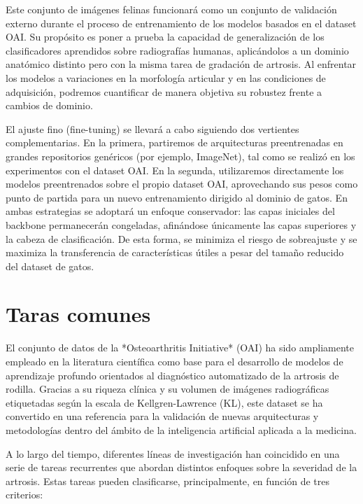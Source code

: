 \documentclass[11pt,spanish,listoffigures,listoftables]{tfgetsinf}
\begin{document}
Este conjunto de imágenes felinas funcionará como un conjunto de validación externo durante el proceso de entrenamiento de 
los modelos basados en el dataset OAI. Su propósito es poner a prueba la capacidad de generalización de los clasificadores 
aprendidos sobre radiografías humanas, aplicándolos a un dominio anatómico distinto pero con la misma tarea de gradación 
de artrosis. Al enfrentar los modelos a variaciones en la morfología articular y en las condiciones de adquisición, 
podremos cuantificar de manera objetiva su robustez frente a cambios de dominio.

El ajuste fino (fine-tuning) se llevará a cabo siguiendo dos vertientes complementarias. En la primera, partiremos de 
arquitecturas preentrenadas en grandes repositorios genéricos (por ejemplo, ImageNet), tal como se realizó en los
experimentos con el dataset OAI. En la segunda, utilizaremos directamente los modelos preentrenados sobre el propio 
dataset OAI, aprovechando sus pesos como punto de partida para un nuevo entrenamiento dirigido al dominio de gatos. 
En ambas estrategias se adoptará un enfoque conservador: las capas iniciales del backbone permanecerán congeladas, 
afinándose únicamente las capas superiores y la cabeza de clasificación. De esta forma, se minimiza el riesgo de 
sobreajuste y se maximiza la transferencia de características útiles a pesar del tamaño reducido del dataset de gatos.

\section{Taras comunes}
\label{sec:common_tasks}

El conjunto de datos de la *Osteoarthritis Initiative* (OAI) ha sido ampliamente empleado en la literatura científica como base para el desarrollo de modelos de aprendizaje
profundo orientados al diagnóstico automatizado de la artrosis de rodilla. Gracias a su riqueza clínica y su volumen de imágenes radiográficas etiquetadas según la escala de
Kellgren-Lawrence (KL), este dataset se ha convertido en una referencia para la validación de nuevas arquitecturas y metodologías dentro del ámbito de la inteligencia 
artificial aplicada a la medicina.

A lo largo del tiempo, diferentes líneas de investigación han coincidido en una serie de tareas recurrentes que abordan distintos enfoques sobre la severidad de la artrosis. 
Estas tareas pueden clasificarse, principalmente, en función de tres criterios:
\end{document}
